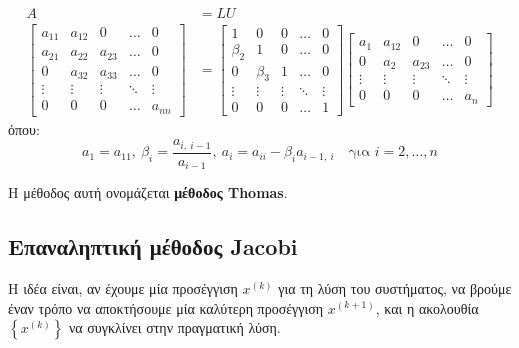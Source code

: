 \documentclass[11pt,a4paper,notitlepage,fleqn,final]{article}
\begin{document}
\paragraph{}
\begin{align*}
	A &= L U \\
	\left[\begin{matrix}
	a_{11}&a_{12}&0&\hdots & 0\\
	a_{21}&a_{22}&a_{23}&\hdots&0\\
	0&a_{32}&a_{33}&\hdots & 0 \\
	\vdots & \vdots & \vdots & \ddots & \vdots \\
	0&0&0&\hdots & a_{nn}
	\end{matrix}\right] &=
	\left[\begin{matrix}
	1&0&0&\hdots&0\\
	\beta_2&1&0&\hdots&0\\
	0&\beta_3&1&\hdots&0\\
	\vdots&\vdots&\vdots&\ddots&\vdots\\
	0&0&0&\hdots&1
	\end{matrix}\right]\left[\begin{matrix}
	a_1 & a_{12} & 0 & \hdots & 0 \\
	0 & a_2 & a_{23} & \hdots & 0 \\
	\vdots & \vdots &\vdots &\ddots&\vdots \\
	0 & 0 & 0 & \hdots & a_n
	\end{matrix}\right]
\end{align*}
όπου:
\[
a_1=a_{11},\ \beta_i=\frac{a_{i,\ i-1}}{a_{i-1}},\
a_i=a_{ii}-\beta_{i}a_{i-1,\ i}
\quad \text{για } i =2,\dots,n
\]

Η μέθοδος αυτή ονομάζεται \textbf{μέθοδος Thomas}.

\subsection{Επαναληπτική μέθοδος Jacobi}

Η ιδέα είναι, αν έχουμε μία προσέγγιση \( x^{(k)} \) για τη
λύση του συστήματος, να βρούμε έναν τρόπο να αποκτήσουμε μία
καλύτερη προσέγγιση \( x^{(k+1)} \), και η ακολουθία
\( \left\lbrace x^{(k)} \right\rbrace \) να συγκλίνει στην
πραγματική λύση.
\end{document}
